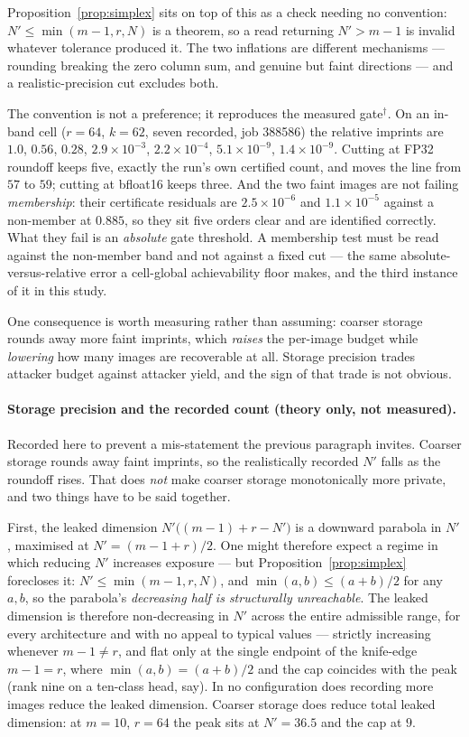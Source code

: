 Proposition~\ref{prop:simplex} sits on top of this as a check needing no
convention: $N'\le\min(m-1,r,N)$ is a theorem, so a read returning $N'>m-1$ is
invalid whatever tolerance produced it. The two inflations are different
mechanisms --- rounding breaking the zero column sum, and genuine but faint
directions --- and a realistic-precision cut excludes both.

The convention is not a preference; it reproduces the measured gate$^\dagger$.
On an in-band cell ($r=64$, $k=62$, seven recorded, job 388586) the relative
imprints are $1.0$, $0.56$, $0.28$, $2.9\times10^{-3}$, $2.2\times10^{-4}$,
$5.1\times10^{-9}$, $1.4\times10^{-9}$. Cutting at FP32 roundoff keeps five,
exactly the run's own certified count, and moves the line from $57$ to $59$;
cutting at bfloat16 keeps three. And the two faint images are not failing
\emph{membership}: their certificate residuals are $2.5\times10^{-6}$ and
$1.1\times10^{-5}$ against a non-member at $0.885$, so they sit five orders
clear and are identified correctly. What they fail is an \emph{absolute} gate
threshold. A membership test must be read against the non-member band and not
against a fixed cut --- the same absolute-versus-relative error a cell-global
achievability floor makes, and the third instance of it in this study.

One consequence is worth measuring rather than assuming: coarser storage
rounds away more faint imprints, which \emph{raises} the per-image budget
while \emph{lowering} how many images are recoverable at all. Storage
precision trades attacker budget against attacker yield, and the sign of that
trade is not obvious.

\paragraph{Storage precision and the recorded count (theory only, not
measured).} Recorded here to prevent a mis-statement the previous paragraph
invites. Coarser storage rounds away faint imprints, so the realistically
recorded $N'$ falls as the roundoff rises. That does \emph{not} make coarser
storage monotonically more private, and two things have to be said together.

First, the leaked dimension $N'\bigl((m-1)+r-N'\bigr)$ is a downward parabola
in $N'$, maximised at $N'=(m-1+r)/2$. One might therefore expect a regime in
which reducing $N'$ increases exposure --- but Proposition~\ref{prop:simplex}
forecloses it: $N'\le\min(m-1,r,N)$, and $\min(a,b)\le(a+b)/2$ for any $a,b$,
so the parabola's \emph{decreasing half is structurally
unreachable}. The leaked dimension is therefore non-decreasing in $N'$ across
the entire admissible range, for every architecture and with no appeal to
typical values --- strictly increasing whenever $m-1\neq r$, and flat only at
the single endpoint of the knife-edge $m-1=r$, where $\min(a,b)=(a+b)/2$ and
the cap coincides with the peak (rank nine on a ten-class head, say). In no
configuration does recording more images reduce the leaked dimension. Coarser storage does reduce
total leaked dimension: at $m=10$, $r=64$ the peak sits at $N'=36.5$ and the
cap at $9$.

